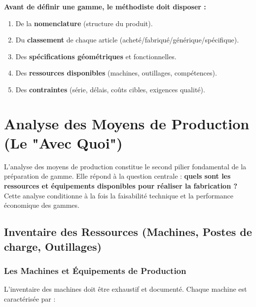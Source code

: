 \documentclass{article}
\begin{document}
\begin{tcolorbox}[colback=green!5!white, colframe=green!50!black, title=Synthèse : Ce qu'il faut savoir]
\begin{center}
\textbf{Avant de définir une gamme, le méthodiste doit disposer :}
\end{center}
\begin{enumerate}
    \item De la \textbf{nomenclature} (structure du produit).
    \item Du \textbf{classement} de chaque article (acheté/fabriqué/générique/spécifique).
    \item Des \textbf{spécifications géométriques} et fonctionnelles.
    \item Des \textbf{ressources disponibles} (machines, outillages, compétences).
    \item Des \textbf{contraintes} (série, délais, coûts cibles, exigences qualité).
\end{enumerate}
\end{tcolorbox}

\section{Analyse des Moyens de Production (Le "Avec Quoi")}

L'analyse des moyens de production constitue le second pilier fondamental de la préparation de gamme. Elle répond à la question centrale : \textbf{quels sont les ressources et équipements disponibles pour réaliser la fabrication ?} Cette analyse conditionne à la fois la faisabilité technique et la performance économique des gammes.

\subsection{Inventaire des Ressources (Machines, Postes de charge, Outillages)}

\subsubsection{Les Machines et Équipements de Production}

L'inventaire des machines doit être exhaustif et documenté. Chaque machine est caractérisée par :
\end{document}
